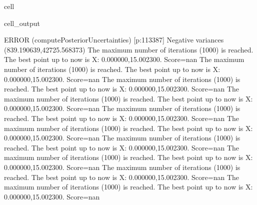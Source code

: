 \documentclass[letterpaper,10pt,english]{jupyterBook}
\begin{document}
\begin{sphinxuseclass}{cell}
\begin{sphinxVerbatimOutput}
\begin{sphinxuseclass}{cell_output}
\begin{sphinxVerbatim}[commandchars=\\\{\}]
ERROR (compute\PYGZus{}Posterior\PYGZus{}Uncertainties) [p:113387] Negative variances (\PYGZhy{}839.190639,42725.568373)
The maximum number of iterations (1000) is reached. The best point up to now is X: \PYGZob{}0.000000,15.002300\PYGZcb{}. Score=\PYGZhy{}nan
The maximum number of iterations (1000) is reached. The best point up to now is X: \PYGZob{}0.000000,15.002300\PYGZcb{}. Score=\PYGZhy{}nan
The maximum number of iterations (1000) is reached. The best point up to now is X: \PYGZob{}0.000000,15.002300\PYGZcb{}. Score=\PYGZhy{}nan
The maximum number of iterations (1000) is reached. The best point up to now is X: \PYGZob{}0.000000,15.002300\PYGZcb{}. Score=\PYGZhy{}nan
The maximum number of iterations (1000) is reached. The best point up to now is X: \PYGZob{}0.000000,15.002300\PYGZcb{}. Score=\PYGZhy{}nan
The maximum number of iterations (1000) is reached. The best point up to now is X: \PYGZob{}0.000000,15.002300\PYGZcb{}. Score=\PYGZhy{}nan
The maximum number of iterations (1000) is reached. The best point up to now is X: \PYGZob{}0.000000,15.002300\PYGZcb{}. Score=\PYGZhy{}nan
The maximum number of iterations (1000) is reached. The best point up to now is X: \PYGZob{}0.000000,15.002300\PYGZcb{}. Score=\PYGZhy{}nan
The maximum number of iterations (1000) is reached. The best point up to now is X: \PYGZob{}0.000000,15.002300\PYGZcb{}. Score=\PYGZhy{}nan
The maximum number of iterations (1000) is reached. The best point up to now is X: \PYGZob{}0.000000,15.002300\PYGZcb{}. Score=\PYGZhy{}nan
\end{sphinxVerbatim}


\end{sphinxuseclass}
\end{sphinxVerbatimOutput}
\end{sphinxuseclass}
\end{document}
